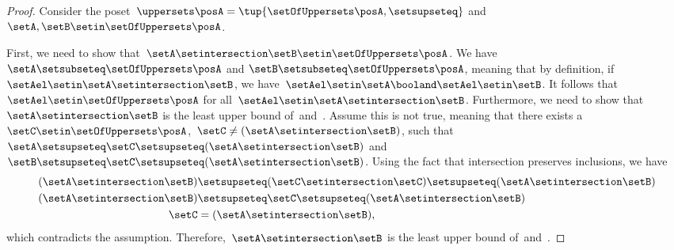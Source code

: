 \begin{proof}
    Consider the poset~$\uppersets \posA=\tup{\setOfUppersets \posA,\setsupseteq}$ and~$\setA,\setB\setin \setOfUppersets \posA$.

    First, we need to show that~$\setA\setintersection \setB\setin \setOfUppersets \posA$.
    We have~$\setA \setsubseteq \setOfUppersets \posA$ and $\setB\setsubseteq \setOfUppersets \posA$, meaning that by definition, if~$\setAel\setin \setA\setintersection \setB$, we have~$\setAel \setin \setA \booland \setAel \setin \setB$.
    It follows that~$\setAel \setin \setOfUppersets \posA$ for all~$\setAel \setin \setA\setintersection \setB$.
    Furthermore, we need to show that~$\setA\setintersection \setB$ is the least upper bound of~\setA and~\setB.
    Assume this is not true, meaning that there exists a~$\setC\setin \setOfUppersets \posA$,~$\setC\neq (\setA\setintersection \setB)$, such that~$\setA\setsupseteq \setC\setsupseteq (\setA\setintersection \setB)$ and~$\setB\setsupseteq \setC\setsupseteq (\setA\setintersection \setB)$.
    Using the fact that intersection preserves inclusions, we have
    \begin{equation}
        \begin{aligned}
            (\setA\setintersection \setB)
                                          & \setsupseteq (\setC\setintersection \setC) \setsupseteq (\setA\setintersection \setB ) \\
            (\setA\setintersection \setB) & \setsupseteq \setC \setsupseteq (\setA\setintersection \setB ) \\
            \setC                         & = (\setA\setintersection \setB),
        \end{aligned}
    \end{equation}
    which contradicts the assumption.
    Therefore,~$\setA\setintersection \setB$ is the least upper bound of~\setA and~\setB.


\end{proof}
